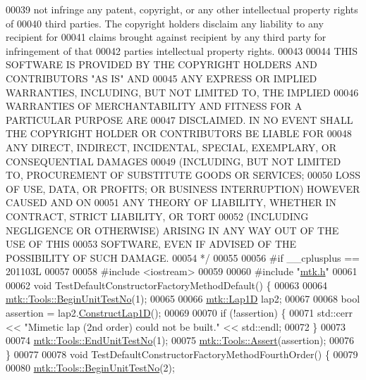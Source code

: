 \begin{DoxyCode}
00039 \textcolor{comment}{not infringe any patent, copyright, or any other intellectual property rights of}
00040 \textcolor{comment}{third parties. The copyright holders disclaim any liability to any recipient for}
00041 \textcolor{comment}{claims brought against recipient by any third party for infringement of that}
00042 \textcolor{comment}{parties intellectual property rights.}
00043 \textcolor{comment}{}
00044 \textcolor{comment}{THIS SOFTWARE IS PROVIDED BY THE COPYRIGHT HOLDERS AND CONTRIBUTORS "AS IS" AND}
00045 \textcolor{comment}{ANY EXPRESS OR IMPLIED WARRANTIES, INCLUDING, BUT NOT LIMITED TO, THE IMPLIED}
00046 \textcolor{comment}{WARRANTIES OF MERCHANTABILITY AND FITNESS FOR A PARTICULAR PURPOSE ARE}
00047 \textcolor{comment}{DISCLAIMED. IN NO EVENT SHALL THE COPYRIGHT HOLDER OR CONTRIBUTORS BE LIABLE FOR}
00048 \textcolor{comment}{ANY DIRECT, INDIRECT, INCIDENTAL, SPECIAL, EXEMPLARY, OR CONSEQUENTIAL DAMAGES}
00049 \textcolor{comment}{(INCLUDING, BUT NOT LIMITED TO, PROCUREMENT OF SUBSTITUTE GOODS OR SERVICES;}
00050 \textcolor{comment}{LOSS OF USE, DATA, OR PROFITS; OR BUSINESS INTERRUPTION) HOWEVER CAUSED AND ON}
00051 \textcolor{comment}{ANY THEORY OF LIABILITY, WHETHER IN CONTRACT, STRICT LIABILITY, OR TORT}
00052 \textcolor{comment}{(INCLUDING NEGLIGENCE OR OTHERWISE) ARISING IN ANY WAY OUT OF THE USE OF THIS}
00053 \textcolor{comment}{SOFTWARE, EVEN IF ADVISED OF THE POSSIBILITY OF SUCH DAMAGE.}
00054 \textcolor{comment}{*/}
00055 
00056 \textcolor{preprocessor}{#if \_\_cplusplus == 201103L}
00057 
00058 \textcolor{preprocessor}{#include <iostream>}
00059 
00060 \textcolor{preprocessor}{#include "\hyperlink{mtk_8h}{mtk.h}"}
00061 
00062 \textcolor{keywordtype}{void} TestDefaultConstructorFactoryMethodDefault() \{
00063 
00064   \hyperlink{classmtk_1_1Tools_afc29ecaf337a13ed2e817d3890a5a441}{mtk::Tools::BeginUnitTestNo}(1);
00065 
00066   \hyperlink{classmtk_1_1Lap1D}{mtk::Lap1D} lap2;
00067 
00068   \textcolor{keywordtype}{bool} assertion = lap2.\hyperlink{classmtk_1_1Lap1D_a685dcba88c08cf5b7b6c2aa4669a472c}{ConstructLap1D}();
00069 
00070   \textcolor{keywordflow}{if} (!assertion) \{
00071     std::cerr << \textcolor{stringliteral}{"Mimetic lap (2nd order) could not be built."} << std::endl;
00072   \}
00073 
00074   \hyperlink{classmtk_1_1Tools_aba67d9dc35c9c1c49430fcc9ea035e03}{mtk::Tools::EndUnitTestNo}(1);
00075   \hyperlink{classmtk_1_1Tools_ac6804df469c94ab6a796fb64f1e44a89}{mtk::Tools::Assert}(assertion);
00076 \}
00077 
00078 \textcolor{keywordtype}{void} TestDefaultConstructorFactoryMethodFourthOrder() \{
00079 
00080   \hyperlink{classmtk_1_1Tools_afc29ecaf337a13ed2e817d3890a5a441}{mtk::Tools::BeginUnitTestNo}(2);

\end{DoxyCode}
